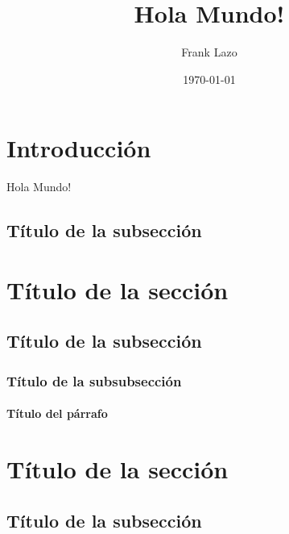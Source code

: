 \documentclass{article}     %
\title{Hola Mundo!}     %
\author{Frank Lazo}     %
\date{\today}           %
\begin{document}

    \renewcommand{\figurename}{Fig.}
    \renewcommand{\listtablename}{Tablas}

    \maketitle          %
    
    \tableofcontents
    \listoffigures
    \listoftables

    \begin{abstract}    %
        \lipsum[1]
    \end{abstract}
    
    \section*{Introducción}  %

        Hola Mundo!         %

        \subsection{Título de la subsección}
            \lipsum[7]
    \section{Título de la sección}
        \lipsum[1]
        \subsection{Título de la subsección}
            \lipsum[2-3]
            \subsubsection{Título de la subsubsección}
                \lipsum[4]
                \paragraph{Título del párrafo} %
                    \lipsum[5]
    \section*{Título de la sección}
        \lipsum[1]
        \subsection*{Título de la subsección}
            \lipsum[2-3]
\end{document}
